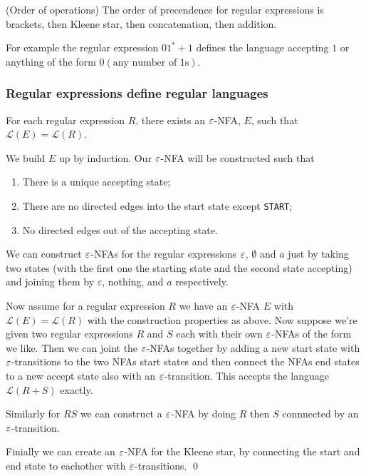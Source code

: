 \documentclass[tikx, border = 10pt]{article}
\begin{document}
\begin{definition}
	(Order of operations) The order of precendence for regular expressions is brackets, then Kleene star, then concatenation, then addition.
\end{definition}
\begin{example}
	For example the regular expression $ 01^* + 1 $ defines the language accepting $ 1 $ or anything of the form $ 0(\text{any number of 1s}) $.
\end{example}
\subsubsection{Regular expressions define regular languages}
\begin{theorem}
  For each regular expression $ R $, there exists an $ \varepsilon $-NFA, $ E $, such that $ \mathcal L(E) = \mathcal L(R) $.
\end{theorem}
\pf We build $ E $ up by induction. Our $ \varepsilon $-NFA will be constructed such that
\begin{enumerate}
	\item There is a unique accepting state;
	\item There are no directed edges into the start state except \verb&START&;
	\item No directed edges out of the accepting state.
\end{enumerate}
We can construct $ \varepsilon $-NFAs for the regular expressions $ \varepsilon $, $ \emptyset $ and $ a $ just by taking two states (with the first one the starting state and the second state accepting) and joining them by $ \varepsilon $, nothing, and $ a $ respectively. \par
Now assume for a regular expression $ R $ we have an $ \varepsilon $-NFA	 $ E $ with $ \mathcal L(E) = \mathcal L(R) $ with the construction properties as above. Now suppose we're given two regular expressions $ R $ and $ S $ each with their own $ \varepsilon $-NFAs of the form we like. Then we can joint the $ \varepsilon $-NFAs together by adding a new start state with $ \varepsilon $-transitions to the two NFAs start states and then connect the NFAs end states to a new accept state also with an $ \varepsilon $-transition. This accepts the language $ \mathcal L(R+S) $ exactly. \par
Similarly for $ RS $ we can construct a $ \varepsilon $-NFA by doing $ R $ then $ S $ connnected by an $ \varepsilon $-transition.
\par
Finially we can create an $ \varepsilon $-NFA for the Kleene star, by connecting the start and end state to eachother with $ \varepsilon $-transitions. \qed
\end{document}
